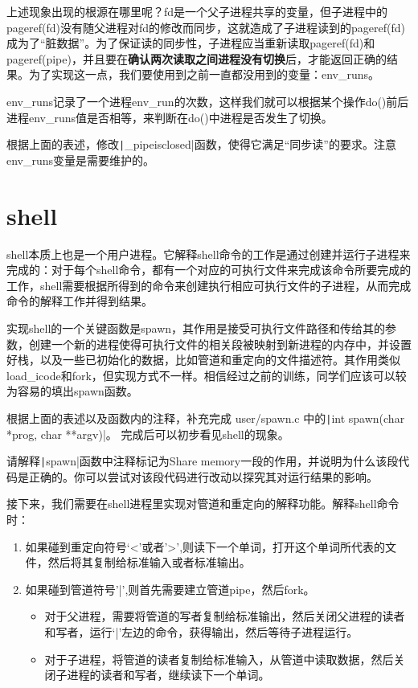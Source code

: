 上述现象出现的根源在哪里呢？fd是一个父子进程共享的变量，但子进程中的pageref(fd)没有随父进程对fd的修改而同步，这就造成了子进程读到的pageref(fd)成为了“脏数据”。为了保证读的同步性，子进程应当重新读取pageref(fd)和pageref(pipe)，并且要在\textbf{确认两次读取之间进程没有切换}后，才能返回正确的结果。为了实现这一点，我们要使用到之前一直都没用到的变量：env\_runs。

env\_runs记录了一个进程env\_run的次数，这样我们就可以根据某个操作do()前后进程env\_runs值是否相等，来判断在do()中进程是否发生了切换。

\begin{exercise}
	根据上面的表述，修改\texttt|_pipeisclosed|函数，使得它满足“同步读”的要求。注意env\_runs变量是需要维护的。
\end{exercise}

\section{shell}

shell本质上也是一个用户进程。它解释shell命令的工作是通过创建并运行子进程来完成的：对于每个shell命令，都有一个对应的可执行文件来完成该命令所要完成的工作，shell需要根据所得到的命令来创建执行相应可执行文件的子进程，从而完成命令的解释工作并得到结果。

实现shell的一个关键函数是spawn，其作用是接受可执行文件路径和传给其的参数，创建一个新的进程使得可执行文件的相关段被映射到新进程的内存中，并设置好栈，以及一些已初始化的数据，比如管道和重定向的文件描述符。其作用类似load\_icode和fork，但实现方式不一样。相信经过之前的训练，同学们应该可以较为容易的填出spawn函数。

\begin{exercise}
  根据上面的表述以及函数内的注释，补充完成 user/spawn.c 中的\texttt|int spawn(char *prog, char **argv)|。
  完成后可以初步看见shell的现象。
\end{exercise}

\begin{thinking}\label{think-spawn}
  请解释\texttt|spawn|函数中注释标记为Share memory一段的作用，并说明为什么该段代码是正确的。你可以尝试对该段代码进行改动以探究其对运行结果的影响。
\end{thinking}

接下来，我们需要在shell进程里实现对管道和重定向的解释功能。解释shell命令时：

\begin{enumerate}
	\item 如果碰到重定向符号‘<’或者’>’,则读下一个单词，打开这个单词所代表的文件，然后将其复制给标准输入或者标准输出。
	\item 如果碰到管道符号’|’,则首先需要建立管道pipe，然后fork。
	\begin{itemize}
		\item 对于父进程，需要将管道的写者复制给标准输出，然后关闭父进程的读者和写者，运行‘|’左边的命令，获得输出，然后等待子进程运行。
		\item 对于子进程，将管道的读者复制给标准输入，从管道中读取数据，然后关闭子进程的读者和写者，继续读下一个单词。
	\end{itemize}
\end{enumerate}

